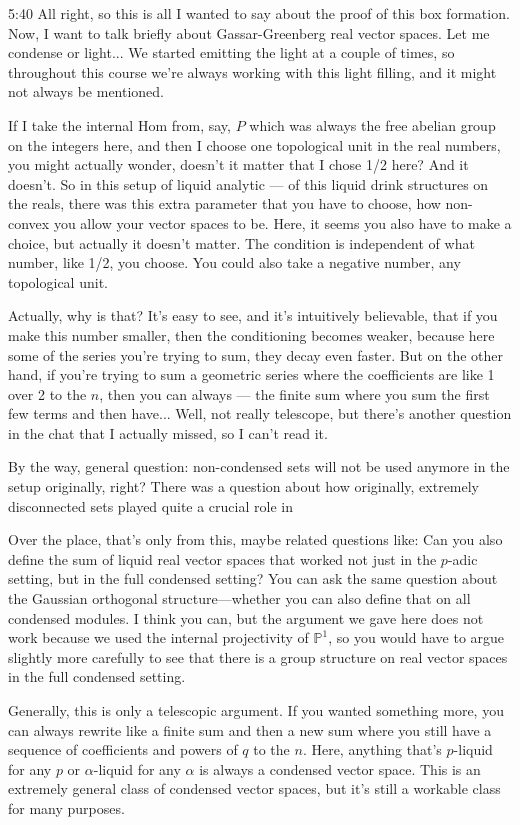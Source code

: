 \begin{unfinished}{5:40}
All right, so this is all I wanted to say about the proof of this box formation. Now, I want to talk briefly about Gassar-Greenberg real vector spaces. Let me condense or light... We started emitting the light at a couple of times, so throughout this course we're always working with this light filling, and it might not always be mentioned.

If I take the internal Hom from, say, $P$ which was always the free abelian group on the integers here, and then I choose one topological unit in the real numbers, you might actually wonder, doesn't it matter that I chose 1/2 here? And it doesn't. So in this setup of liquid analytic --- of this liquid drink structures on the reals, there was this extra parameter that you have to choose, how non-convex you allow your vector spaces to be. Here, it seems you also have to make a choice, but actually it doesn't matter. The condition is independent of what number, like 1/2, you choose. You could also take a negative number, any topological unit.

Actually, why is that? It's easy to see, and it's intuitively believable, that if you make this number smaller, then the conditioning becomes weaker, because here some of the series you're trying to sum, they decay even faster. But on the other hand, if you're trying to sum a geometric series where the coefficients are like 1 over 2 to the $n$, then you can always --- the finite sum where you sum the first few terms and then have... Well, not really telescope, but there's another question in the chat that I actually missed, so I can't read it.

By the way, general question: non-condensed sets will not be used anymore in the setup originally, right? There was a question about how originally, extremely disconnected sets played quite a crucial role in

Over the place, that's only from this, maybe related questions like: Can you also define the sum of liquid real vector spaces that worked not just in the $p$-adic setting, but in the full condensed setting? You can ask the same question about the Gaussian orthogonal structure---whether you can also define that on all condensed modules. I think you can, but the argument we gave here does not work because we used the internal projectivity of $\mathbb{P}^1$, so you would have to argue slightly more carefully to see that there is a group structure on real vector spaces in the full condensed setting.

Generally, this is only a telescopic argument. If you wanted something more, you can always rewrite like a finite sum and then a new sum where you still have a sequence of coefficients and powers of $q$ to the $n$. Here, anything that's $p$-liquid for any $p$ or $\alpha$-liquid for any $\alpha$ is always a condensed vector space. This is an extremely general class of condensed vector spaces, but it's still a workable class for many purposes.


\end{unfinished}
